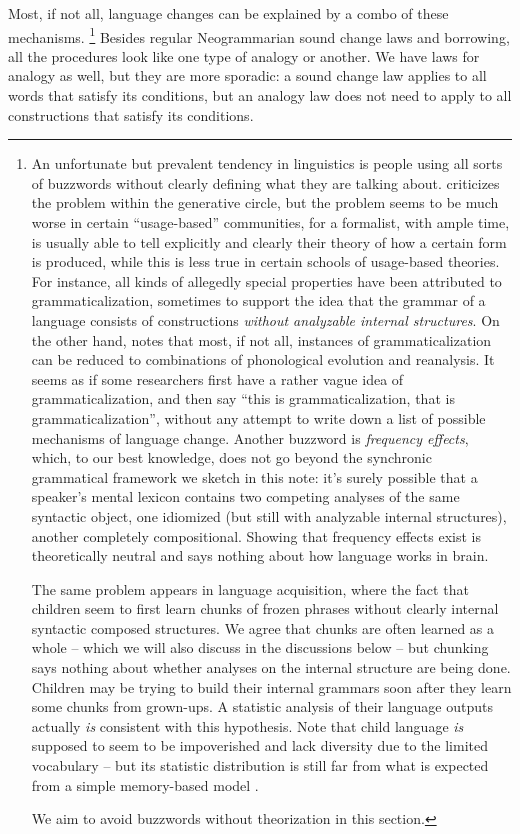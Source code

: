 \documentclass[a4paper, oneside, scheme=plain, 12pt]{article}
\newcommand*{\citepages}[1]{pp.~{#1}}
\newcommand*{\term}[1]{\emph{#1}}
\begin{document}
Most, if not all, language changes can be explained by a combo of these mechanisms.%
\footnote{
    An unfortunate but prevalent tendency in linguistics is
    people using all sorts of buzzwords without clearly defining what they are talking about.
    \citet{dixon2009basic1} criticizes the problem within the generative circle,
    but the problem seems to be much worse in certain ``usage-based'' communities,
    for a formalist, with ample time, is usually able to tell explicitly and clearly their theory of how a certain form is produced,
    while this is less true in certain schools of usage-based theories.
    For instance, all kinds of allegedly special properties have been attributed to grammaticalization,
    sometimes to support the idea that the grammar of a language consists of 
    constructions \emph{without analyzable internal structures}.
    On the other hand, \citet[\citepages{284-285}]{campbell2013historical}
    notes that most, if not all, instances of grammaticalization can be reduced to combinations of 
    phonological evolution and reanalysis.
    It seems as if some researchers first have a rather vague idea of grammaticalization,
    and then say ``this is grammaticalization, that is grammaticalization'',
    without any attempt to write down a list of possible mechanisms of language change.
    Another buzzword is \term{frequency effects}, which, to our best knowledge,
    does not go beyond the synchronic grammatical framework we sketch in this note:
    it's surely possible that a speaker's mental lexicon contains two competing analyses
    of the same syntactic object, one idiomized (but still with analyzable internal structures),
    another completely compositional.
    Showing that frequency effects exist is theoretically neutral and says nothing about how language works in brain.

    The same problem appears in language acquisition,
    where the fact that children seem to first learn chunks of frozen phrases
    without clearly internal syntactic composed structures.
    We agree that chunks are often learned as a whole --
    which we will also discuss in the discussions below --
    but chunking says nothing about whether analyses on the internal structure are being done.
    Children may be trying to build their internal grammars soon after they learn some chunks from grown-ups.
    A statistic analysis of their language outputs actually \emph{is} consistent with this hypothesis.
    Note that child language \emph{is} supposed to seem to be impoverished and lack diversity
    due to the limited vocabulary -- but its statistic distribution is still
    far from what is expected from a simple memory-based model \citep{yang2013ontogeny}.

    We aim to avoid buzzwords without theorization in this section.
}
Besides regular Neogrammarian sound change laws and borrowing,
all the procedures look like one type of analogy or another.
We have laws for analogy as well, but they are more sporadic:
a sound change law applies to all words that satisfy its conditions,
but an analogy law does not need to apply to all constructions that satisfy its conditions.
\end{document}

